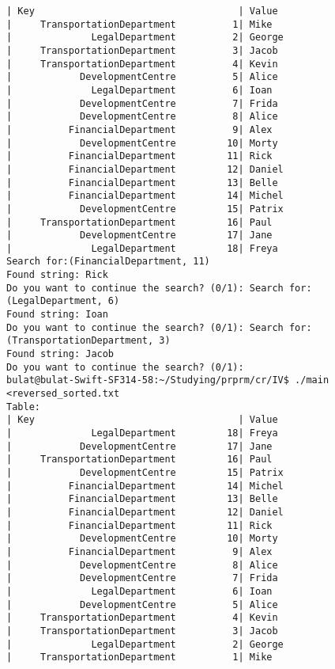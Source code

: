 \documentclass[a4paper]{article}
\newcounter{i}
\begin{document}
\begin{enumerate}[label=\textbf{\arabic*}.]
\begin{verbatim}
| Key                                    | Value
|     TransportationDepartment          1| Mike
|              LegalDepartment          2| George
|     TransportationDepartment          3| Jacob
|     TransportationDepartment          4| Kevin
|            DevelopmentCentre          5| Alice
|              LegalDepartment          6| Ioan
|            DevelopmentCentre          7| Frida
|            DevelopmentCentre          8| Alice
|          FinancialDepartment          9| Alex
|            DevelopmentCentre         10| Morty
|          FinancialDepartment         11| Rick
|          FinancialDepartment         12| Daniel
|          FinancialDepartment         13| Belle
|          FinancialDepartment         14| Michel
|            DevelopmentCentre         15| Patrix
|     TransportationDepartment         16| Paul
|            DevelopmentCentre         17| Jane
|              LegalDepartment         18| Freya
Search for:(FinancialDepartment, 11)
Found string: Rick
Do you want to continue the search? (0/1): Search for:(LegalDepartment, 6)
Found string: Ioan
Do you want to continue the search? (0/1): Search for:(TransportationDepartment, 3)
Found string: Jacob
Do you want to continue the search? (0/1): 
bulat@bulat-Swift-SF314-58:~/Studying/prprm/cr/IV$ ./main <reversed_sorted.txt 
Table: 
| Key                                    | Value
|              LegalDepartment         18| Freya
|            DevelopmentCentre         17| Jane
|     TransportationDepartment         16| Paul
|            DevelopmentCentre         15| Patrix
|          FinancialDepartment         14| Michel
|          FinancialDepartment         13| Belle
|          FinancialDepartment         12| Daniel
|          FinancialDepartment         11| Rick
|            DevelopmentCentre         10| Morty
|          FinancialDepartment          9| Alex
|            DevelopmentCentre          8| Alice
|            DevelopmentCentre          7| Frida
|              LegalDepartment          6| Ioan
|            DevelopmentCentre          5| Alice
|     TransportationDepartment          4| Kevin
|     TransportationDepartment          3| Jacob
|              LegalDepartment          2| George
|     TransportationDepartment          1| Mike


\end{verbatim}
\end{enumerate}
\end{document}
